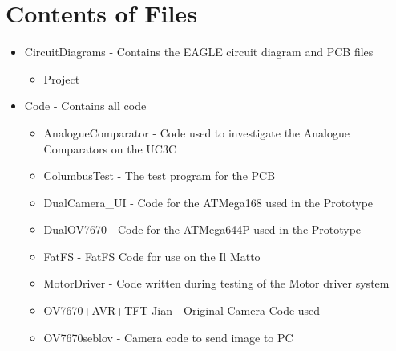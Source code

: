 \chapter{Contents of Files} \label{Appendix:Contents}
\begin{itemize}
\item CircuitDiagrams - Contains the EAGLE circuit diagram and PCB files
\begin{itemize}
\item Project
\end{itemize}
\item Code - Contains all code
\begin{itemize}
\item AnalogueComparator - Code used to investigate the Analogue Comparators on the UC3C
\item ColumbusTest - The test program for the PCB
\item DualCamera\_UI - Code for the ATMega168 used in the Prototype
\item DualOV7670 - Code for the ATMega644P used in the Prototype
\item FatFS - FatFS Code for use on the Il Matto 
\item MotorDriver - Code written during testing of the Motor driver system
\item OV7670+AVR+TFT-Jian - Original Camera Code used
\item OV7670seblov - Camera code to send image to PC

\end{itemize}
\end{itemize}
